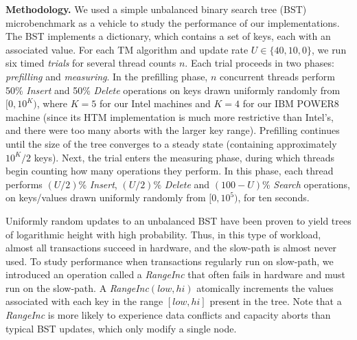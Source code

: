 \vspace{1mm}\noindent\textbf{Methodology.}
We used a simple unbalanced binary search tree (BST) microbenchmark as a vehicle to study the performance of our implementations.
The BST implements a dictionary, which contains a set of keys, each with an associated value.
For each TM algorithm %
and update rate $U \in \{40, 10, 0\}$, we run six timed \textit{trials} for several thread counts $n$.
Each trial proceeds in two phases: \textit{prefilling} and \textit{measuring}.
In the prefilling phase, $n$ concurrent threads perform 50\% \textit{Insert} and 50\% \textit{Delete} operations on keys drawn uniformly randomly from $[0, 10^K)$, where $K=5$ for our Intel machines and $K=4$ for our IBM POWER8 machine (since its HTM implementation is much more restrictive than Intel's, and there were too many aborts with the larger key range).
Prefilling continues until the size of the tree converges to a steady state (containing approximately $10^K/2$ keys).
Next, the trial enters the measuring phase, during which threads begin counting how many operations they perform.
In this phase, each thread performs $(U/2)$\% \textit{Insert}, $(U/2)$\% \textit{Delete} and $(100-U)$\% \textit{Search} operations, on keys/values drawn uniformly randomly from $[0,10^5)$, for ten seconds.

Uniformly random updates to an unbalanced BST have been proven to yield trees of logarithmic height with high probability.
Thus, in this type of workload, almost all transactions succeed in hardware, and the slow-path is almost never used.
To study performance when transactions regularly run on slow-path, we introduced an operation called a \textit{RangeInc} that often fails in hardware and must run on the slow-path.
A \textit{RangeInc}$(low, hi)$ atomically increments the values 
associated with each key in the range $[low, hi]$ present in the tree.
Note that a \textit{RangeInc} is more likely to experience data 
conflicts and capacity aborts than typical BST updates, which only modify a single node.

